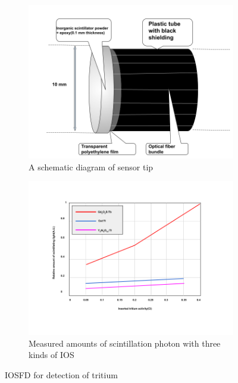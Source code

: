 \documentclass{article}
\begin{document}
\begin{figure}[H]
    \begin{subfigure}{0.5\textwidth}
    \centering
    \includegraphics[width=\linewidth]{images/sensor tip.png}
    \caption{A schematic diagram of sensor tip}
    \label{fig:fig3a}
    \end{subfigure}
    \begin{subfigure}{0.5\textwidth}
    \centering
    \includegraphics[width=\linewidth]{images/graph.png}
    \caption{Measured amounts of scintillation photon with three kinds of IOS}
    \label{fig:fig3b}
    \end{subfigure}
    \caption{IOSFD for detection of tritium}
\end{figure}
\end{document}
